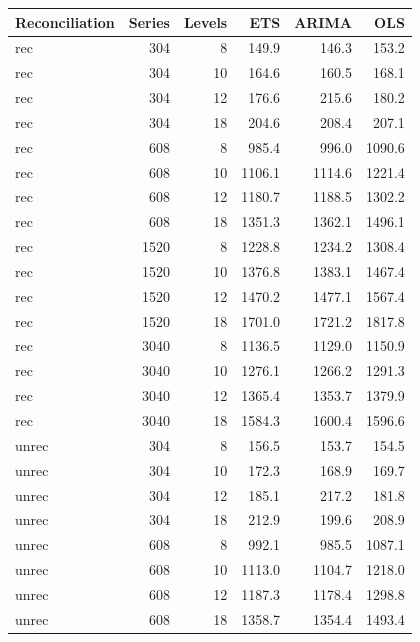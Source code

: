 \documentclass[11pt,a4paper,]{article}
\let\origtable\table
\let\endorigtable\endtable
\renewenvironment{table}[1][2] {
    \expandafter\origtable\expandafter[!htbp]
} {
    \endorigtable
}
\begin{document}
\begin{table}[!h]

\caption{\label{tab:TourismdatasimrollinglevelNS}Mean RMSE on 8, 10, 12 and 18 levels of hierarchy with 304, 608, 1520 and 3040 number of bottom level series for ETS, ARIMA and OLS with and without reconciliation - two years forecast points with 0.5 error value - rolling origin - Simulated tourism dataset}
\centering
\begin{tabular}[t]{lrrrrr}
\toprule
Reconciliation & Series & Levels & ETS & ARIMA & OLS\\
\midrule
rec & 304 & 8 & 149.9 & 146.3 & 153.2\\
rec & 304 & 10 & 164.6 & 160.5 & 168.1\\
rec & 304 & 12 & 176.6 & 215.6 & 180.2\\
rec & 304 & 18 & 204.6 & 208.4 & 207.1\\
rec & 608 & 8 & 985.4 & 996.0 & 1090.6\\
rec & 608 & 10 & 1106.1 & 1114.6 & 1221.4\\
rec & 608 & 12 & 1180.7 & 1188.5 & 1302.2\\
rec & 608 & 18 & 1351.3 & 1362.1 & 1496.1\\
rec & 1520 & 8 & 1228.8 & 1234.2 & 1308.4\\
rec & 1520 & 10 & 1376.8 & 1383.1 & 1467.4\\
rec & 1520 & 12 & 1470.2 & 1477.1 & 1567.4\\
rec & 1520 & 18 & 1701.0 & 1721.2 & 1817.8\\
rec & 3040 & 8 & 1136.5 & 1129.0 & 1150.9\\
rec & 3040 & 10 & 1276.1 & 1266.2 & 1291.3\\
rec & 3040 & 12 & 1365.4 & 1353.7 & 1379.9\\
rec & 3040 & 18 & 1584.3 & 1600.4 & 1596.6\\
unrec & 304 & 8 & 156.5 & 153.7 & 154.5\\
unrec & 304 & 10 & 172.3 & 168.9 & 169.7\\
unrec & 304 & 12 & 185.1 & 217.2 & 181.8\\
unrec & 304 & 18 & 212.9 & 199.6 & 208.9\\
unrec & 608 & 8 & 992.1 & 985.5 & 1087.1\\
unrec & 608 & 10 & 1113.0 & 1104.7 & 1218.0\\
unrec & 608 & 12 & 1187.3 & 1178.4 & 1298.8\\
unrec & 608 & 18 & 1358.7 & 1354.4 & 1493.4\\

\end{tabular}
\end{table}
\end{document}
